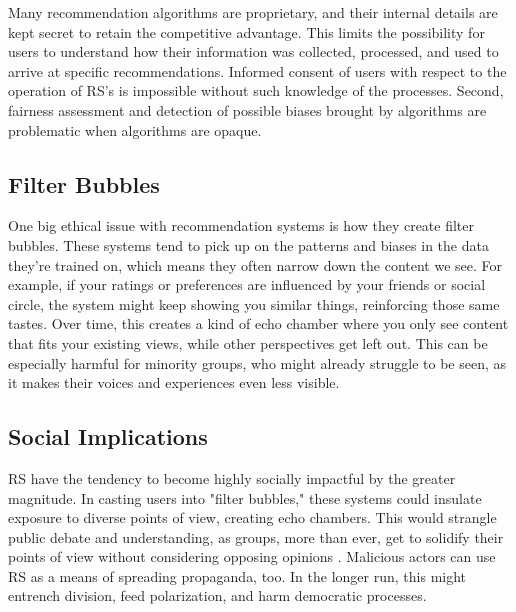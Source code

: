 \documentclass{article}
\begin{document}
Many recommendation algorithms are proprietary, and their internal details are kept secret to retain the competitive advantage. This limits the possibility for users to understand how their information was collected, processed, and used to arrive at specific recommendations. Informed consent of users with respect to the operation of RS's is impossible without such knowledge of the processes. Second, fairness assessment and detection of possible biases brought by algorithms are problematic when algorithms are opaque.\cite{IaAEC_in_RS}

\subsection{ Filter Bubbles}
One big ethical issue with recommendation systems is how they create filter bubbles. These systems tend to pick up on the patterns and biases in the data they're trained on, which means they often narrow down the content we see. For example, if your ratings or preferences are influenced by your friends or social circle, the system might keep showing you similar things, reinforcing those same tastes.\cite{IaAEC_in_RS}\cite{EOPIF} Over time, this creates a kind of echo chamber where you only see content that fits your existing views, while other perspectives get left out. This can be especially harmful for minority groups, who might already struggle to be seen, as it makes their voices and experiences even less visible.\cite{FB}
\clearpage
\subsection{Social Implications}

RS have the tendency to become highly socially impactful by the greater magnitude. In casting users into "filter bubbles," these systems could insulate exposure to diverse points of view, creating echo chambers. This would strangle public debate and understanding, as groups, more than ever, get to solidify their points of view without considering opposing opinions \cite{FB}. Malicious actors can use RS as a means of spreading propaganda, too. In the longer run, this might entrench division, feed polarization, and harm democratic processes.
\end{document}
